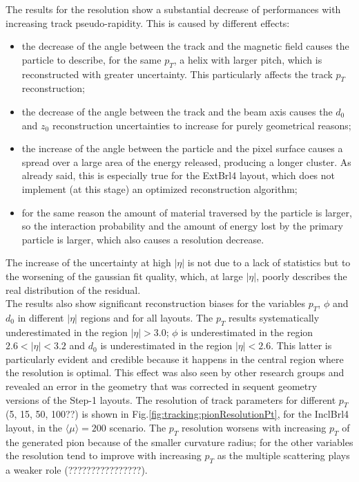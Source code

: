 \documentclass[a4paper,twoside,12pt]{book}
\begin{document}
The results for the resolution show a substantial decrease of performances with increasing track pseudo-rapidity. This is caused by different effects: 

\begin{itemize}
\item the decrease of the angle between  the track and the magnetic field causes the particle to describe, for the same $p_{T}$, a helix with larger pitch,
	which is reconstructed with greater uncertainty. This particularly affects the track $p_{T}$ reconstruction;
\item the decrease of the angle between the track and the beam axis causes the $d_{0}$ and $z_{0}$ reconstruction uncertainties to increase for purely geometrical reasons;
\item the increase of the angle between the particle and the pixel surface causes a spread over a large area of the energy released, producing a longer cluster. As already
said, this is especially true for the ExtBrl4 layout, which does not implement (at this stage) an optimized reconstruction algorithm;
\item for the same reason the amount of material traversed by the particle is larger, so the interaction probability and the amount of energy lost by the primary particle is larger, which also causes a resolution decrease.
\end{itemize}

The increase of the uncertainty at high $|\eta|$ is not due to a lack of statistics but to the
worsening of the gaussian fit quality, which, at large $|\eta|$, poorly describes the real distribution of the residual.\\

The results also show significant reconstruction biases for the variables $p_{T}$, $\phi$ and $d_{0}$ in different $|\eta|$ regions and for all layouts. The $p_{T}$ results systematically underestimated in the region
$|\eta| > 3.0$; 	$\phi$ is underestimated in the region $2.6 < |\eta| < 3.2$ and $d_{0}$  is underestimated in the region $|\eta| < 2.6$. This latter is particularly evident and credible because
it happens in the central region where the resolution is optimal. This effect was also seen by other research groups and revealed an error in the geometry that was corrected in sequent geometry versions of the Step-1 layouts.  
The resolution of track parameters for different $p_{T}$ (5, 15, 50, 100??) is shown in Fig.\ref{fig:tracking:pionResolutionPt}, for the InclBrl4 layout, in the $\langle\mu\rangle = 200$ scenario. The $p_{T}$ resolution worsens with
increasing $p_{T}$ of the generated pion because of the smaller curvature radius; 
for the other variables the resolution tend to improve with increasing $p_{T}$ as the 
multiple scattering plays a weaker role (????????????????).\\ 
\end{document}

